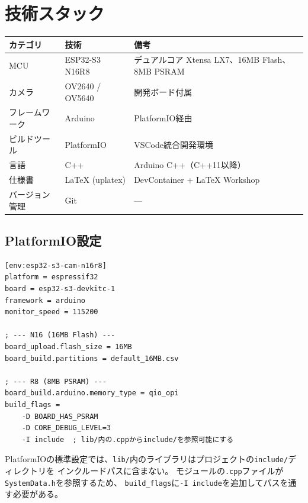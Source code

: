 \section{技術スタック}

\begin{tabularx}{\textwidth}{l l X}
\toprule
\textbf{カテゴリ} & \textbf{技術} & \textbf{備考} \\
\midrule
MCU & ESP32-S3 N16R8 & デュアルコア Xtensa LX7、16MB Flash、8MB PSRAM \\
カメラ & OV2640 / OV5640 & 開発ボード付属 \\
フレームワーク & Arduino & PlatformIO経由 \\
ビルドツール & PlatformIO & VSCode統合開発環境 \\
言語 & C++ & Arduino C++（C++11以降） \\
仕様書 & LaTeX (uplatex) & DevContainer + LaTeX Workshop \\
バージョン管理 & Git & — \\
\bottomrule
\end{tabularx}

\subsection{PlatformIO設定}

\begin{lstlisting}[basicstyle=\ttfamily\small, frame=single, caption={platformio.ini}]
[env:esp32-s3-cam-n16r8]
platform = espressif32
board = esp32-s3-devkitc-1
framework = arduino
monitor_speed = 115200

; --- N16 (16MB Flash) ---
board_upload.flash_size = 16MB
board_build.partitions = default_16MB.csv

; --- R8 (8MB PSRAM) ---
board_build.arduino.memory_type = qio_opi
build_flags =
    -D BOARD_HAS_PSRAM
    -D CORE_DEBUG_LEVEL=3
    -I include  ; lib/内の.cppからinclude/を参照可能にする
\end{lstlisting}

\begin{notebox}
PlatformIOの標準設定では、\texttt{lib/}内のライブラリはプロジェクトの\texttt{include/}ディレクトリを
インクルードパスに含まない。
モジュールの\texttt{.cpp}ファイルが\texttt{SystemData.h}を参照するため、
\texttt{build\_flags}に\texttt{-I include}を追加してパスを通す必要がある。
\end{notebox}
